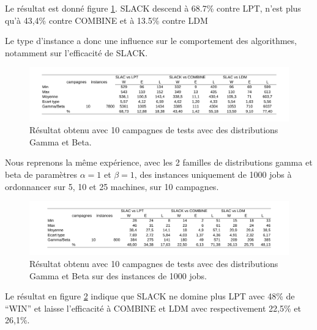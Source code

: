 \documentclass[a4paper,12pt]{report}
\theoremstyle{plain}				%
\theoremstyle{definition}				%
\newcommand{\lp}[1]{\todo[author=LP,color=yellow,inline]{#1}}
\begin{document}
Le résultat est donné figure \ref{fig:resultatReproduction10GammaBeta}.
SLACK descend à 68.7\% contre LPT, 
n'est plus qu'à 43,4\% contre COMBINE et
à 13.5\% contre LDM

\bigskip
Le type d'instance a donc une influence sur le comportement des algorithmes, notamment sur l'efficacité de SLACK.
   
\begin{figure}
{\centering
\includegraphics[width=\columnwidth]{5_Resultat_Reproduction10GammaBeta.pdf}
\caption{Résultat obtenu avec 10 campagnes de tests avec des distributions Gamma et Beta.}
\label{fig:resultatReproduction10GammaBeta}
\par}
\end{figure}

\bigskip
Nous reprenons la même expérience, avec les 2 familles de distributions 
  gamma et beta de paramètres $\alpha = 1$ et $\beta = 1$,
  des instances uniquement de 1000 jobs à ordonnancer sur 5, 10 et 25 machines,
  sur 10 campagnes.
\lp{Dire pourquoi tu fais ça}
\begin{figure}
{\centering
\includegraphics[width=\columnwidth]{6_Resultat_Reproduction10GammaBeta1000.pdf}
\caption{Résultat obtenu avec 10 campagnes de tests avec des distributions Gamma et Beta sur des instances de 1000 jobs.}
\label{fig:resultatReproduction10GammaBeta1000}
\par}
\end{figure}

Le résultat en figure \ref{fig:resultatReproduction10GammaBeta1000} indique que 
  SLACK ne domine plus LPT avec 48\% de ``WIN'' et
  laisse l'efficacité à COMBINE et LDM avec respectivement 22,5\% et 26,1\%.
\end{document}

